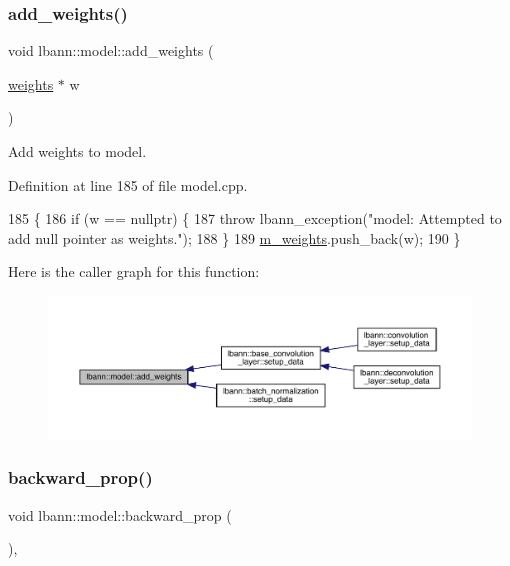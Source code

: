 \subsubsection{\texorpdfstring{add\+\_\+weights()}{add\_weights()}}
{\footnotesize\ttfamily void lbann\+::model\+::add\+\_\+weights (\begin{DoxyParamCaption}\item[{\hyperlink{classlbann_1_1weights}{weights} $\ast$}]{w }\end{DoxyParamCaption})}

Add weights to model. 

Definition at line 185 of file model.\+cpp.


\begin{DoxyCode}
185                                   \{
186   \textcolor{keywordflow}{if} (w == \textcolor{keyword}{nullptr}) \{
187     \textcolor{keywordflow}{throw} lbann\_exception(\textcolor{stringliteral}{"model: Attempted to add null pointer as weights."});
188   \}
189   \hyperlink{classlbann_1_1model_aaf9adefe4497d90bf5bc2567e71bfb00}{m\_weights}.push\_back(w);
190 \}
\end{DoxyCode}
Here is the caller graph for this function\+:\nopagebreak
\begin{figure}[H]
\begin{center}
\leavevmode
\includegraphics[width=350pt]{classlbann_1_1model_af35fca77e75eb6dd570e4727aa3d5b6b_icgraph}
\end{center}
\end{figure}
\mbox{\label{classlbann_1_1model_a2ce4444efaab4dd1236c837d6847e438}} 
\subsubsection{\texorpdfstring{backward\+\_\+prop()}{backward\_prop()}}
{\footnotesize\ttfamily void lbann\+::model\+::backward\+\_\+prop (\begin{DoxyParamCaption}{ }\end{DoxyParamCaption})\hspace{0.3cm}{\ttfamily [protected]}, {\ttfamily [virtual]}}


